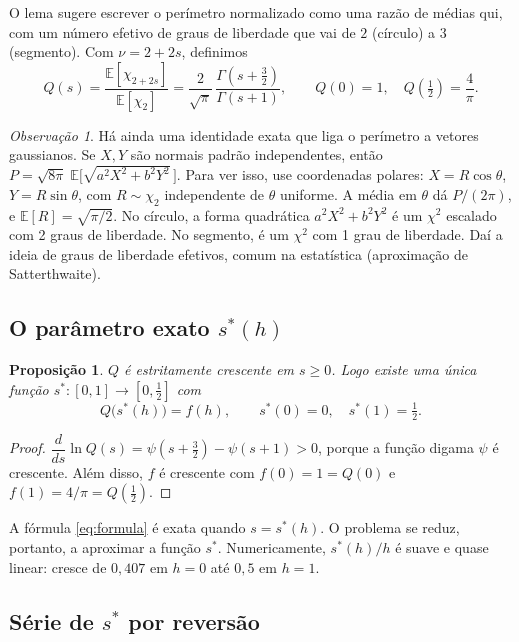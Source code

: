 \documentclass[11pt,a4paper]{article}
\newtheorem{proposicao}[teorema]{Proposição}
\theoremstyle{definition}
\theoremstyle{remark}
\newtheorem{observacao}[teorema]{Observação}
\newcommand{\E}{\mathbb{E}}
\begin{document}
O lema sugere escrever o perímetro normalizado como uma razão de médias qui, com
um número efetivo de graus de liberdade que vai de $2$ (círculo) a $3$
(segmento). Com $\nu=2+2s$, definimos
\begin{equation}\label{eq:Q}
  Q(s)=\frac{\E[\chi_{2+2s}]}{\E[\chi_2]}
      =\frac{2}{\sqrt\pi}\,\frac{\Gamma\!\left(s+\frac32\right)}{\Gamma(s+1)},
  \qquad Q(0)=1,\quad Q\!\left(\tfrac12\right)=\frac4\pi .
\end{equation}

\begin{observacao}
Há ainda uma identidade exata que liga o perímetro a vetores gaussianos.
Se $X,Y$ são normais padrão independentes, então
$P=\sqrt{8\pi}\;\E\big[\sqrt{a^2X^2+b^2Y^2}\,\big]$.
Para ver isso, use coordenadas polares: $X=R\cos\theta$, $Y=R\sin\theta$, com $R\sim\chi_2$
independente de $\theta$ uniforme. A média em $\theta$ dá $P/(2\pi)$, e $\E[R]=\sqrt{\pi/2}$.
No círculo, a forma quadrática $a^2X^2+b^2Y^2$ é um $\chi^2$ escalado com 2 graus de liberdade.
No segmento, é um $\chi^2$ com 1 grau de liberdade. Daí a ideia de graus de liberdade
efetivos, comum na estatística (aproximação de Satterthwaite).
\end{observacao}

\subsection{O parâmetro exato \texorpdfstring{$s^*(h)$}{s*(h)}}

\begin{proposicao}
$Q$ é estritamente crescente em $s\ge0$. Logo existe uma única função
$s^*:[0,1]\to[0,\tfrac12]$ com
\begin{equation}
  Q\big(s^*(h)\big)=f(h),\qquad s^*(0)=0,\quad s^*(1)=\tfrac12 .
\end{equation}
\end{proposicao}
\begin{proof}
$\dfrac{d}{ds}\ln Q(s)=\psi\!\left(s+\tfrac32\right)-\psi(s+1)>0$, porque a função
digama $\psi$ é crescente. Além disso, $f$ é crescente com $f(0)=1=Q(0)$ e
$f(1)=4/\pi=Q(\frac12)$.
\end{proof}

A fórmula \eqref{eq:formula} é exata quando $s=s^*(h)$. O problema se reduz,
portanto, a aproximar a função $s^*$. Numericamente, $s^*(h)/h$ é suave e
quase linear: cresce de $0{,}407$ em $h=0$ até $0{,}5$ em $h=1$.

\subsection{Série de \texorpdfstring{$s^*$}{s*} por reversão}
\end{document}
